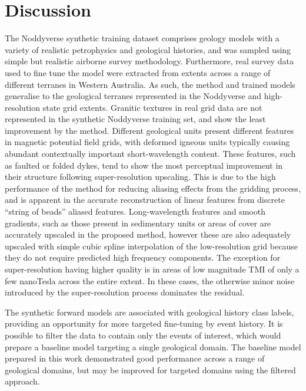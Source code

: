 \documentclass[manuscript.tex]{subfiles}
\begin{document}
{\section{Discussion}
The Noddyverse synthetic training dataset comprises geology models with a variety of realistic petrophysics and geological histories, and was sampled using simple but realistic airborne survey methodology.
Furthermore, real survey data used to fine tune the model were extracted from extents across a range of different terranes in Western Australia.
As such, the method and trained models generalise to the geological terranes represented in the Noddyverse and high-resolution state grid extents.
Granitic textures in real grid data are not represented in the synthetic Noddyverse training set, and show the least improvement by the method.
Different geological units present different features in magnetic potential field grids, with deformed igneous units typically causing abundant contextually important short-wavelength content.
These features, such as faulted or folded dykes, tend to show the most perceptual improvement in their structure following super-resolution upscaling.
This is due to the high performance of the method for reducing aliasing effects from the gridding process, and is apparent in the accurate reconstruction of linear features from discrete “string of beads” aliased features.
Long-wavelength features and smooth gradients, such as those present in sedimentary units or areas of cover are accurately upscaled in the proposed method, however these are also adequately upscaled with simple cubic spline interpolation of the low-resolution grid because they do not require predicted high frequency components.
The exception for super-resolution having higher quality is in areas of low magnitude TMI of only a few nanoTesla across the entire extent.
In these cases, the otherwise minor noise introduced by the super-resolution process dominates the residual.

The synthetic forward models are associated with geological history class labels, providing an opportunity for more targeted fine-tuning by event history.
It is possible to filter the data to contain only the events of interest, which would prepare a baseline model targeting a single geological domain.
The baseline model prepared in this work demonstrated good performance across a range of geological domains, but may be improved for targeted domains using the filtered approach.

}
\end{document}
